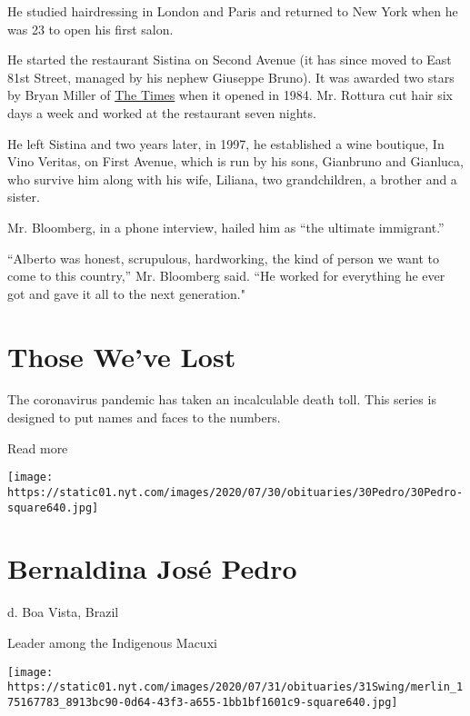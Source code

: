 He studied hairdressing in London and Paris and returned to New York
when he was 23 to open his first salon.

He started the restaurant Sistina on Second Avenue (it has since moved
to East 81st Street, managed by his nephew Giuseppe Bruno). It was
awarded two stars by Bryan Miller of
\href{https://www.nytimes.com/1984/11/16/arts/restaurants-northern-italian-onsecondavenue.html}{The
Times} when it opened in 1984. Mr. Rottura cut hair six days a week and
worked at the restaurant seven nights.

He left Sistina and two years later, in 1997, he established a wine
boutique, In Vino Veritas, on First Avenue, which is run by his sons,
Gianbruno and Gianluca, who survive him along with his wife, Liliana,
two grandchildren, a brother and a sister.

Mr. Bloomberg, in a phone interview, hailed him as ``the ultimate
immigrant.''

``Alberto was honest, scrupulous, hardworking, the kind of person we
want to come to this country,'' Mr. Bloomberg said. ``He worked for
everything he ever got and gave it all to the next generation."

\href{https://www.nytimes.com/interactive/2020/obituaries/people-died-coronavirus-obituaries.html?action=click\&pgtype=Article\&state=default\&region=BELOW_MAIN_CONTENT\&context=covid_obits_promo}{}

\hypertarget{those-weve-lost}{%
\section{Those We've Lost}\label{those-weve-lost}}

The coronavirus pandemic has taken an incalculable death toll. This
series is designed to put names and faces to the numbers.

Read more

\texttt{[image: https://static01.nyt.com/images/2020/07/30/obituaries/30Pedro/30Pedro-square640.jpg]}

\hypertarget{bernaldina-josuxe9-pedro}{%
\section{Bernaldina José Pedro}\label{bernaldina-josuxe9-pedro}}

d. Boa Vista, Brazil

Leader among the Indigenous Macuxi

\texttt{[image: https://static01.nyt.com/images/2020/07/31/obituaries/31Swing/merlin\_175167783\_8913bc90-0d64-43f3-a655-1bb1bf1601c9-square640.jpg]}

